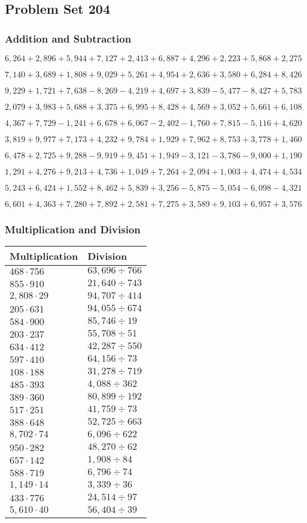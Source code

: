 \hypertarget{problem-set-204}{%
\subsection{Problem Set 204}\label{problem-set-204}}

\hypertarget{addition-and-subtraction}{%
\subsubsection{Addition and
Subtraction}\label{addition-and-subtraction}}

\(6,264+2,896+5,944+7,127+2,413+6,887+4,296+2,223+5,868+2,275\)

\(7,140+3,689+1,808+9,029+5,261+4,954+2,636+3,580+6,284+8,426\)

\(9,229+1,721+7,638-8,269-4,219+4,697+3,839-5,477-8,427+5,783\)

\(2,079+3,983+5,688+3,375+6,995+8,428+4,569+3,052+5,661+6,108\)

\(4,367+7,729-1,241+6,678+6,067-2,402-1,760+7,815-5,116+4,620\)

\(3,819+9,977+7,173+4,232+9,784+1,929+7,962+8,753+3,778+1,460\)

\(6,478+2,725+9,288-9,919+9,451+1,949-3,121-3,786-9,000+1,190\)

\(1,291+4,276+9,213+4,736+1,049+7,264+2,094+1,003+4,474+4,534\)

\(5,243+6,424+1,552+8,462+5,839+3,256-5,875-5,054-6,098-4,321\)

\(6,601+4,363+7,280+7,892+2,581+7,275+3,589+9,103+6,957+3,576\)

\hypertarget{multiplication-and-division}{%
\subsubsection{Multiplication and
Division}\label{multiplication-and-division}}

\begin{longtable}[]{@{}ll@{}}
\toprule
Multiplication & Division\tabularnewline
\midrule
\endhead
\(468\cdot756\) & \(63,696÷766\)\tabularnewline
\(855\cdot910\) & \(21,640÷743\)\tabularnewline
\(2,808\cdot29\) & \(94,707÷414\)\tabularnewline
\(205\cdot631\) & \(94,055÷674\)\tabularnewline
\(584\cdot900\) & \(85,746÷19\)\tabularnewline
\(203\cdot237\) & \(55,708÷51\)\tabularnewline
\(634\cdot412\) & \(42,287÷550\)\tabularnewline
\(597\cdot410\) & \(64,156÷73\)\tabularnewline
\(108\cdot188\) & \(31,278÷719\)\tabularnewline
\(485\cdot393\) & \(4,088÷362\)\tabularnewline
\(389\cdot360\) & \(80,899÷192\)\tabularnewline
\(517\cdot251\) & \(41,759÷73\)\tabularnewline
\(388\cdot648\) & \(52,725÷663\)\tabularnewline
\(8,702\cdot74\) & \(6,096÷622\)\tabularnewline
\(950\cdot282\) & \(48,270÷62\)\tabularnewline
\(657\cdot142\) & \(1,908÷84\)\tabularnewline
\(588\cdot719\) & \(6,796÷74\)\tabularnewline
\(1,149\cdot14\) & \(3,339÷36\)\tabularnewline
\(433\cdot776\) & \(24,514÷97\)\tabularnewline
\(5,610\cdot40\) & \(56,404÷39\)\tabularnewline
\bottomrule
\end{longtable}
